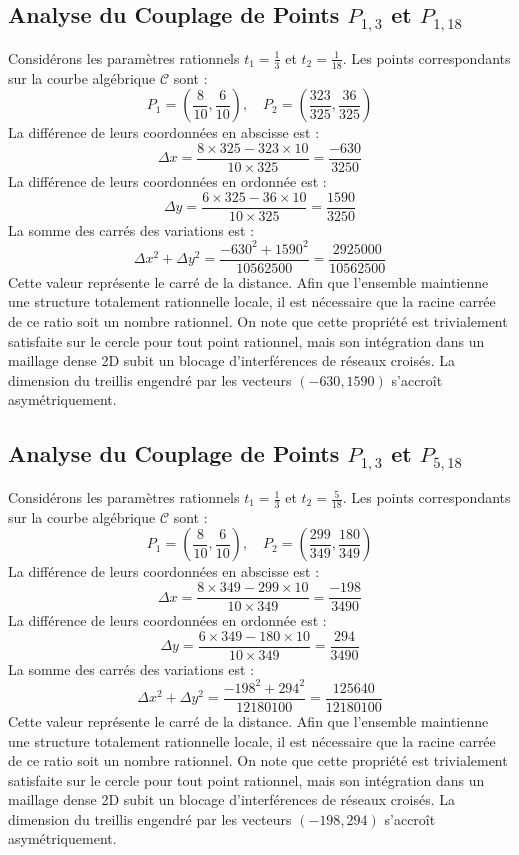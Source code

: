 \documentclass[12pt, a4paper]{article}
\begin{document}
\subsection{Analyse du Couplage de Points $P_{1,3}$ et $P_{1,18}$}
Considérons les paramètres rationnels $t_1 = \frac{1}{3}$ et $t_2 = \frac{1}{18}$.
Les points correspondants sur la courbe algébrique $\mathcal{C}$ sont :
$$ P_1 = \left( \frac{8}{10}, \frac{6}{10} \right), \quad P_2 = \left( \frac{323}{325}, \frac{36}{325} \right) $$
La différence de leurs coordonnées en abscisse est :
$$ \Delta x = \frac{8 \times 325 - 323 \times 10}{10 \times 325} = \frac{-630}{3250} $$
La différence de leurs coordonnées en ordonnée est :
$$ \Delta y = \frac{6 \times 325 - 36 \times 10}{10 \times 325} = \frac{1590}{3250} $$
La somme des carrés des variations est :
$$ \Delta x^2 + \Delta y^2 = \frac{ -630^2 + 1590^2 }{ 10562500 } = \frac{ 2925000 }{ 10562500 } $$
Cette valeur représente le carré de la distance. Afin que l'ensemble maintienne une structure totalement rationnelle locale, il est nécessaire que la racine carrée de ce ratio soit un nombre rationnel. On note que cette propriété est trivialement satisfaite sur le cercle pour tout point rationnel, mais son intégration dans un maillage dense 2D subit un blocage d'interférences de réseaux croisés. La dimension du treillis engendré par les vecteurs $( -630, 1590 )$ s'accroît asymétriquement.


\subsection{Analyse du Couplage de Points $P_{1,3}$ et $P_{5,18}$}
Considérons les paramètres rationnels $t_1 = \frac{1}{3}$ et $t_2 = \frac{5}{18}$.
Les points correspondants sur la courbe algébrique $\mathcal{C}$ sont :
$$ P_1 = \left( \frac{8}{10}, \frac{6}{10} \right), \quad P_2 = \left( \frac{299}{349}, \frac{180}{349} \right) $$
La différence de leurs coordonnées en abscisse est :
$$ \Delta x = \frac{8 \times 349 - 299 \times 10}{10 \times 349} = \frac{-198}{3490} $$
La différence de leurs coordonnées en ordonnée est :
$$ \Delta y = \frac{6 \times 349 - 180 \times 10}{10 \times 349} = \frac{294}{3490} $$
La somme des carrés des variations est :
$$ \Delta x^2 + \Delta y^2 = \frac{ -198^2 + 294^2 }{ 12180100 } = \frac{ 125640 }{ 12180100 } $$
Cette valeur représente le carré de la distance. Afin que l'ensemble maintienne une structure totalement rationnelle locale, il est nécessaire que la racine carrée de ce ratio soit un nombre rationnel. On note que cette propriété est trivialement satisfaite sur le cercle pour tout point rationnel, mais son intégration dans un maillage dense 2D subit un blocage d'interférences de réseaux croisés. La dimension du treillis engendré par les vecteurs $( -198, 294 )$ s'accroît asymétriquement.
\end{document}
